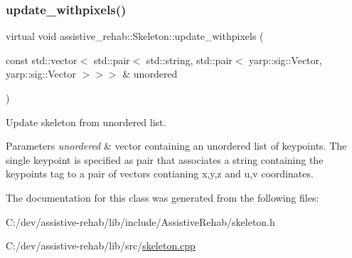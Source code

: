 \subsubsection{\texorpdfstring{update\_withpixels()}{update\_withpixels()}\hspace{0.1cm}{\footnotesize\ttfamily [2/2]}}
{\footnotesize\ttfamily virtual void assistive\+\_\+rehab\+::\+Skeleton\+::update\+\_\+withpixels (\begin{DoxyParamCaption}\item[{const std\+::vector$<$ std\+::pair$<$ std\+::string, std\+::pair$<$ yarp\+::sig\+::\+Vector, yarp\+::sig\+::\+Vector $>$$>$$>$ \&}]{unordered }\end{DoxyParamCaption})\hspace{0.3cm}{\ttfamily [virtual]}}



Update skeleton from unordered list. 


\begin{DoxyParams}{Parameters}
{\em unordered} & vector containing an unordered list of keypoints. The single keypoint is specified as pair that associates a string containing the keypoint\textquotesingle{}s tag to a pair of vectors contianing x,y,z and u,v coordinates. \\
\hline
\end{DoxyParams}


The documentation for this class was generated from the following files\+:\begin{DoxyCompactItemize}
\item 
C\+:/dev/assistive-\/rehab/lib/include/\+Assistive\+Rehab/skeleton.\+h\item 
C\+:/dev/assistive-\/rehab/lib/src/\mbox{\hyperlink{skeleton_8cpp}{skeleton.\+cpp}}\end{DoxyCompactItemize}
